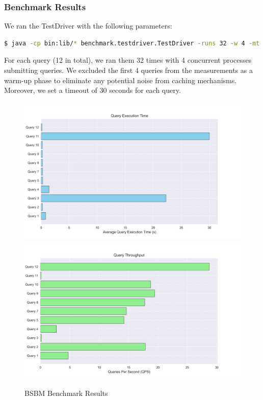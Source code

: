 \subsubsection{Benchmark Results}
We ran the TestDriver with the following parameters:
\begin{lstlisting}[language=bash, caption={BSBM TestDriver class execution}, label={lst:testdriver}]
    $ java -cp bin:lib/* benchmark.testdriver.TestDriver -runs 32 -w 4 -mt 4 -t 30000 http://localhost:7200/repositories/BSBM
\end{lstlisting}
For each query (12 in total), we ran them 32 times with 4 concurrent processes submitting queries. We excluded the first 4 queries from the measurements as a warm-up phase to eliminate any potential noise from caching mechanisms. Moreover, we set a timeout of 30 seconds for each query.
\\
\begin{figure}[!ht]
\includegraphics[width=16.5cm]{res/query_execution_time.png}
\\
\includegraphics[width=16.5cm]{res/query_throughput.png}
\caption{BSBM Benchmark Results}
\label{fig:bsbmbenchmarkresults}
\end{figure}
